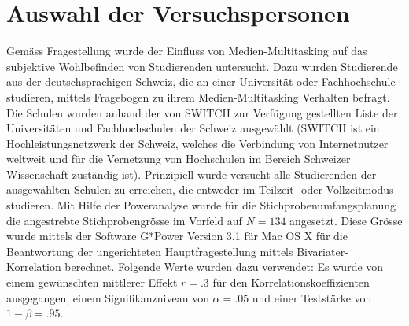 \section{Auswahl der Versuchspersonen}\label{section.auswahlVersuchsp}
Gemäss Fragestellung wurde der Einfluss von Medien-Multitasking auf das subjektive Wohlbefinden von Studierenden untersucht. Dazu wurden Studierende aus der deutschsprachigen Schweiz, die an einer Universität oder Fachhochschule studieren, mittels Fragebogen zu ihrem Medien-Multitasking Verhalten befragt. Die Schulen wurden anhand der von SWITCH \cite{Switch2014} zur Verfügung gestellten Liste der Universitäten und Fachhochschulen der Schweiz ausgewählt (SWITCH ist ein Hochleistungsnetzwerk der Schweiz, welches die Verbindung von Internetnutzer weltweit und für die Vernetzung von Hochschulen im Bereich Schweizer Wissenschaft zuständig ist). Prinzipiell wurde versucht alle Studierenden der ausgewählten Schulen zu erreichen, die entweder im Teilzeit- oder Vollzeitmodus studieren. Mit Hilfe der Poweranalyse \cite{Faul2009} wurde für die Stichprobenumfangsplanung die angestrebte  Stichprobengrösse im Vorfeld auf $N = 134$ angesetzt. Diese Grösse wurde mittels der Software G*Power Version 3.1 für Mac OS X für die Beantwortung der ungerichteten Hauptfragestellung mittels Bivariater-Korrelation berechnet. Folgende Werte wurden dazu verwendet: Es wurde von einem gewünschten mittlerer Effekt $r = .3$  \cite{Cohen1988} für den Korrelationskoeffizienten ausgegangen, einem Signifikanzniveau von $\alpha=.05$ und einer Teststärke von $1-\beta=.95$.

